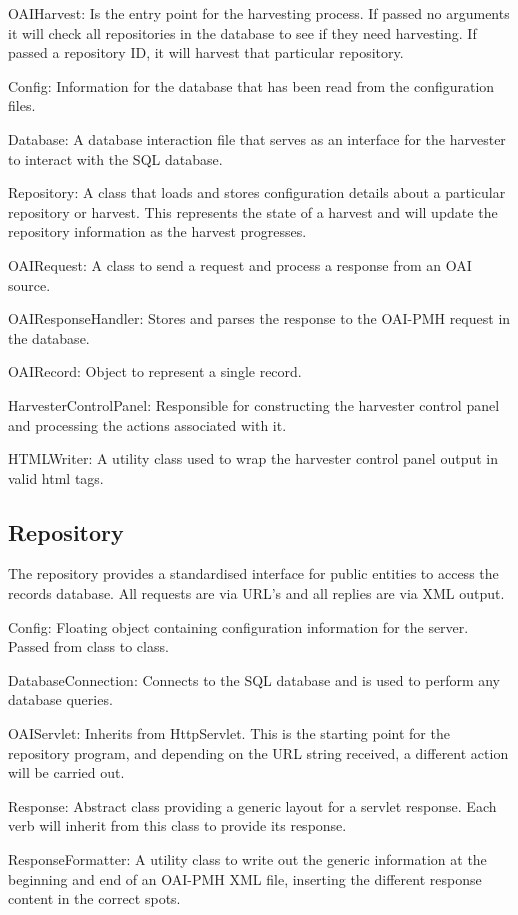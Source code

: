 \documentclass[a4paper,11pt]{article}
\begin{document}
OAIHarvest: Is the entry point for the harvesting process. If passed no arguments it will check all repositories in the database to see if they need harvesting. If passed a repository ID, it will harvest that particular repository.

Config: Information for the database that has been read from the configuration files.

Database: A database interaction file that serves as an interface for the harvester to interact with the SQL database.

Repository: A class that loads and stores configuration details about a particular repository or harvest. This represents the state of a harvest and will update the repository information as the harvest progresses.

OAIRequest: A class to send a request and process a response from an OAI source.

OAIResponseHandler: Stores and parses the response to the OAI-PMH request in the database.

OAIRecord: Object to represent a single record.

HarvesterControlPanel: Responsible for constructing the harvester control panel and processing the actions associated with it.

HTMLWriter: A utility class used to wrap the harvester control panel output in valid html tags.

\subsection{Repository}

The repository provides a standardised interface for public entities to access the records database. All requests are via URL's and all replies are via XML output.

Config: Floating object containing configuration information for the server. Passed from class to class.

DatabaseConnection: Connects to the SQL database and is used to perform any database queries.

OAIServlet: Inherits from HttpServlet. This is the starting point for the repository program, and depending on the URL string received, a different action will be carried out.

Response: Abstract class providing a generic layout for a servlet response. Each verb will inherit from this class to provide its response.

ResponseFormatter: A utility class to write out the generic information at the beginning and end of an OAI-PMH XML file, inserting the different response content in the correct spots.
\end{document}
